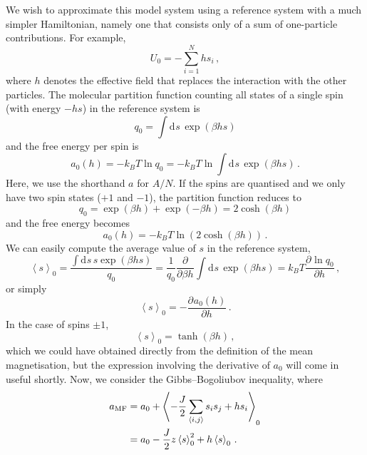 \documentclass{article}
\theoremstyle{plain}\theoremheaderfont{\normalfont\bfseries}\theorembodyfont{\rmfamily}\theoremseparator{.}\newtheorem*{thm}{Theorem}\newtheorem*{law}{Law}\newtheorem*{pos}{Postulate}
\numberwithin{equation}{section}
\newcommand{\dd}[2][]{\mathrm{d}^{#1} #2\,}
\newcommand{\pdv}[3][]{\frac{\partial^{#1} #2}{{\partial #3}^{#1}}}
\newcommand{\eval}[1]{\left\langle #1 \right\rangle}
\begin{document}
    We wish to approximate this model system using a reference system with a much simpler Hamiltonian, namely one that consists only of a sum of one-particle contributions. For example,
    \begin{equation}
        U_0=-\sum_{i=1}^{N}hs_i\,,
    \end{equation}
    where \(h\) denotes the effective field that replaces the interaction with the other particles. The molecular partition function counting all states of a single spin (with energy \(-hs\)) in the reference system is
    \begin{equation}
        q_0=\int\dd{s}\exp(\beta hs)
    \end{equation}
    and the free energy per spin is
    \begin{equation}
        a_0(h)=-k_BT\ln q_0=-k_BT\ln\int\dd{s}\exp(\beta hs)\,.
    \end{equation}
    Here, we use the shorthand \(a\) for \(A/N\). If the spins are quantised and we only have two spin states (\(+1\) and \(-1\)), the partition function reduces to
    \begin{equation}
        q_0=\exp(\beta h)+\exp(-\beta h)=2\cosh(\beta h)
    \end{equation}
    and the free energy becomes
    \begin{equation}
        a_0(h)=-k_BT\ln(2\cosh(\beta h))\,.
    \end{equation}
    We can easily compute the average value of \(s\) in the reference system,
    \begin{equation}
        \eval{s}_0=\frac{\int\dd{s}s\exp(\beta hs)}{q_0}=\frac{1}{q_0}\pdv{}{\beta h}\int\dd{s}\exp(\beta hs)=k_B T\pdv{\ln q_0}{h}\,,
    \end{equation}
    or simply
    \begin{equation}
        \eval{s}_0=-\pdv{a_0(h)}{h}\,.
    \end{equation}
    In the case of spins \(\pm 1\),
    \begin{equation}\label{Ising_average_spin}
        \eval{s}_0=\tanh(\beta h)\,,
    \end{equation}
    which we could have obtained directly from the definition of the mean magnetisation, but the expression involving the derivative of \(a_0\) will come in useful shortly. Now, we consider the Gibbs--Bogoliubov inequality, where
    \begin{align}
        a_{\text{MF}}&=a_0+\eval{-\frac{J}{2}\sum_{\langle i,j\rangle}s_is_j+hs_i}_0\notag\\
        &=a_0-\frac{J}{2}z\eval{s}_0^2+h\eval{s}_0\,.\label{Ising_free_energy}
    \end{align}
\end{document}
